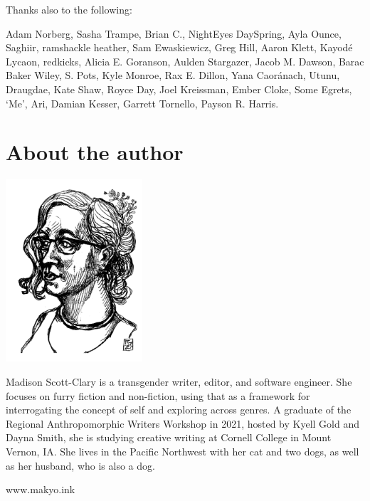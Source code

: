 Thanks also to the following:

Adam Norberg,
Sasha Trampe,
Brian C.,
NightEyes DaySpring,
Ayla Ounce,
Saghiir,
ramshackle heather,
Sam Ewaskiewicz,
Greg Hill,
Aaron Klett,
Kayodé Lycaon,
redkicks,
Alicia E. Goranson,
Aulden Stargazer,
Jacob M. Dawson,
Barac Baker Wiley,
S. Pots,
Kyle Monroe,
Rax E. Dillon,
Yana Caoránach,
Utunu,
Draugdae,
Kate Shaw,
Royce Day,
Joel Kreissman,
Ember Cloke,
Some Egrets,
`Me',
Ari,
Damian Kesser,
Garrett Tornello,
Payson R. Harris.

\chapter*{About the author}

\begin{center}
  \includegraphics[width=2in]{content/headshot.png}
\end{center}

\noindent Madison Scott-Clary is a transgender writer, editor, and software engineer. She focuses on furry fiction and non-fiction, using that as a framework for interrogating the concept of self and exploring across genres. A graduate of the Regional Anthropomorphic Writers Workshop in 2021, hosted by Kyell Gold and Dayna Smith, she is studying creative writing at Cornell College in Mount Vernon, IA. She lives in the Pacific Northwest with her cat and two dogs, as well as her husband, who is also a dog.

\begin{center}
    www.makyo.ink
\end{center}

\vfill
